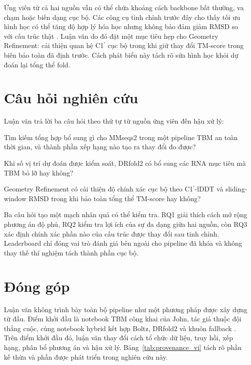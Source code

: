 \documentclass[12pt,a4paper,oneside]{report}
\newcommand{\cprime}{C1$^{\prime}$}
\begin{document}
Ứng viên từ cả hai nguồn vẫn có thể chứa khoảng cách backbone bất thường, va chạm hoặc
biến dạng cục bộ. Các công cụ tinh chỉnh trước đây cho thấy tối ưu hình học có thể tăng
độ hợp lý hóa học nhưng không bảo đảm giảm RMSD so với cấu trúc thật
\cite{qrnas,arena}. Luận văn do đó đặt một mục tiêu hẹp cho Geometry Refinement: cải
thiện quan hệ \cprime{} cục bộ trong khi giữ thay đổi TM-score trong biên bảo toàn đã
định trước. Cách phát biểu này tách rõ sửa hình học khỏi dự đoán lại tổng thể fold.

\section{Câu hỏi nghiên cứu}

Luận văn trả lời ba câu hỏi theo thứ tự từ nguồn ứng viên đến hậu xử lý:

\begin{description}[leftmargin=1.4cm,style=nextline]
  \item[RQ1.] Tìm kiếm tổng hợp bổ sung gì cho MMseqs2 trong một pipeline TBM an toàn
  thời gian, và thành phần xếp hạng nào tạo ra thay đổi đo được?
  \item[RQ2.] Khi số vị trí dự đoán được kiểm soát, DRfold2 có bổ sung các RNA mục tiêu mà
  TBM bỏ lỡ hay không?
  \item[RQ3.] Geometry Refinement có cải thiện độ chính xác cục bộ theo
  \cprime{}-lDDT và sliding-window RMSD trong khi bảo toàn tổng thể TM-score hay không?
\end{description}

Ba câu hỏi tạo một mạch nhân quả có thể kiểm tra. RQ1 giải thích cách mở rộng phương án
độ phủ, RQ2 kiểm tra lợi ích của sự đa dạng giữa hai nguồn, còn RQ3 xác định chính xác
phần nào của cấu trúc được thay đổi sau tinh chỉnh. Leaderboard chỉ đóng vai trò đánh
giá bên ngoài cho pipeline đã khóa và không thay thế thí nghiệm tách thành phần cục bộ.

\section{Đóng góp}

Luận văn không trình bày toàn bộ pipeline như một phương pháp được xây dựng từ đầu. Điểm
khởi đầu là notebook TBM công khai của John, tác giả thuộc đội thắng cuộc, cùng notebook
hybrid kết hợp Boltz, DRfold2 và khuôn fallback \cite{kaggle_top1,kaggle_hybrid}.
Trên điểm khởi đầu đó, luận văn thay đổi cách tổ chức dữ liệu, truy hồi, xếp hạng,
phân bổ phương án và hậu xử lý. Bảng~\ref{tab:provenance_vi} tách rõ phần kế thừa và phần
được phát triển trong nghiên cứu này.
\end{document}
